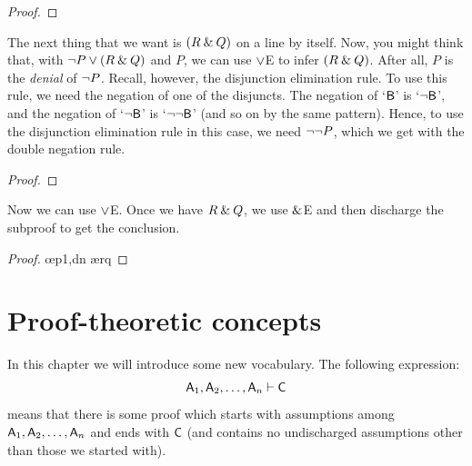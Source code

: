 \begin{proof}
	 	
	\open
\end{proof}
The next thing that we want is $(R \mathbin{\&} Q)$ on a line by itself. Now, you might think that, with ${\neg} P \vee (R \mathbin{\&} Q)$ and $P$, we can use $\vee$E to infer $(R \mathbin{\&} Q)$. After all, $P$ is the \textit{denial} of ${\neg} P$. Recall, however, the disjunction elimination rule.
\noindent To use this rule, we need the negation of one of the disjuncts. The negation of `$\mathsf{B}$' is `${\neg}\mathsf{B}$', and the negation of 
`${\neg}\mathsf{B}$' is `${\neg}{\neg}\mathsf{B}$' (and so on by the same pattern). Hence, to use the disjunction elimination rule in this case, we need ${\neg}{\neg} P$, which we get with the double negation rule.

\begin{proof}
	 	
	\open
		 
\end{proof}
Now we can use $\vee$E. Once we have $R \mathbin{\&} Q$, we use $\mathbin{\&}$E and then discharge the subproof to get the conclusion.

\begin{proof}
	 	
	\open
		 
		 \oe{p1,dn}
		 \ae{rq}
	\close
\end{proof}






\chapter{Proof-theoretic concepts}\label{s:ProofTheoreticConcepts}

In this chapter we will introduce some new vocabulary. The following expression:
$$\mathsf{A}_1, \mathsf{A}_2, \ldots, \mathsf{A}_n \vdash \mathsf{C}$$
means that there is some proof which starts with assumptions among $\mathsf{A}_1, \mathsf{A}_2, \ldots, \mathsf{A}_n$ and ends with $\mathsf{C}$ (and contains no undischarged assumptions other than those we started with).  

